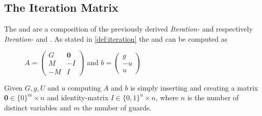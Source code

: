 \subsection{The Iteration Matrix}
The \iterationmatrix and \iterationconstants are a composition of the previously derived \textit{Iteration-} and \guardmatrix respectively \textit{Iteration- } and \guardconstants. \newline
As stated in \autoref{def:iteration} the \iterationmatrix and \iterationconstants can be computed as
\begin{figure}[H]
	\centering
	$A = \begin{pmatrix} G & \textbf{0} \\ M & -I \\ -M & I \end{pmatrix}$ and $b = \begin{pmatrix} g \\ -u \\ u \end{pmatrix}$ \cite{leike2014geometric}
\end{figure}
Given $G, g, U$ and $u$ computing $A$ and $b$ is simply inserting and creating a matrix \textbf{0}$ \in \{0\}^m\times n$ and identity-matrix $I \in \{0,1\}^n\times n$, where $n$ is the number of distinct variables and $m$ the number of guards.

